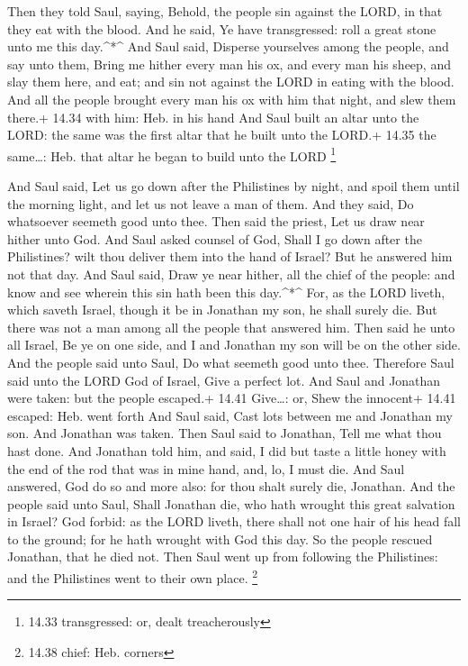  Then they told Saul, saying, Behold, the people sin
against the LORD, in that they eat with the blood. And he said, Ye have
transgressed: roll a great stone unto me this day.\^{}*\^{}
 And Saul said, Disperse yourselves among the people, and
say unto them, Bring me hither every man his ox, and every man his
sheep, and slay them here, and eat; and sin not against the LORD in
eating with the blood. And all the people brought every man his ox with
him that night, and slew them there.+ 14.34 with him: Heb. in his hand
 And Saul built an altar unto the LORD: the same was the
first altar that he built unto the LORD.+ 14.35 the same\ldots: Heb.
that altar he began to build unto the LORD \footnote{14.33 transgressed:
  or, dealt treacherously}

 And Saul said, Let us go down after the Philistines by
night, and spoil them until the morning light, and let us not leave a
man of them. And they said, Do whatsoever seemeth good unto thee. Then
said the priest, Let us draw near hither unto God.  And
Saul asked counsel of God, Shall I go down after the Philistines? wilt
thou deliver them into the hand of Israel? But he answered him not that
day.  And Saul said, Draw ye near hither, all the chief of
the people: and know and see wherein this sin hath been this
day.\^{}*\^{}  For, as the LORD liveth, which saveth
Israel, though it be in Jonathan my son, he shall surely die. But there
was not a man among all the people that answered him.  Then
said he unto all Israel, Be ye on one side, and I and Jonathan my son
will be on the other side. And the people said unto Saul, Do what
seemeth good unto thee.  Therefore Saul said unto the LORD
God of Israel, Give a perfect lot. And Saul and Jonathan were taken: but
the people escaped.+ 14.41 Give\ldots: or, Shew the innocent+ 14.41
escaped: Heb. went forth  And Saul said, Cast lots between
me and Jonathan my son. And Jonathan was taken.  Then Saul
said to Jonathan, Tell me what thou hast done. And Jonathan told him,
and said, I did but taste a little honey with the end of the rod that
was in mine hand, and, lo, I must die.  And Saul answered,
God do so and more also: for thou shalt surely die, Jonathan.
 And the people said unto Saul, Shall Jonathan die, who
hath wrought this great salvation in Israel? God forbid: as the LORD
liveth, there shall not one hair of his head fall to the ground; for he
hath wrought with God this day. So the people rescued Jonathan, that he
died not.  Then Saul went up from following the
Philistines: and the Philistines went to their own place. \footnote{14.38
  chief: Heb. corners}

